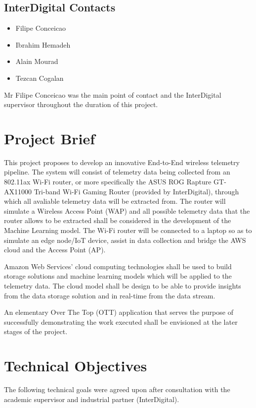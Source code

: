 \subsection{InterDigital Contacts}

\begin{itemize}
  \item Filipe Conceicao
  \item Ibrahim Hemadeh
  \item Alain Mourad
  \item Tezcan Cogalan
\end{itemize}

Mr Filipe Conceicao was the main point of contact and the InterDigital supervisor throughout the duration of this project.

\section{Project Brief}
\label{0_2_project_brief}
This project proposes to develop an innovative End-to-End wireless telemetry pipeline. The system will consist of telemetry data being collected from an 802.11ax Wi-Fi router, or more specifically the ASUS ROG Rapture GT-AX11000 Tri-band Wi-Fi Gaming Router \cite{ASUSRouter} (provided by InterDigital), through which all avaliable telemetry data will be extracted from. The router will simulate a Wireless Access Point (WAP) and all possible telemetry data that the router allows to be extracted shall be considered in the development of the Machine Learning model. The Wi-Fi router will be connected to a laptop so as to simulate an edge node/IoT device, assist in data collection and bridge the AWS cloud and the Access Point (AP). 

\noindent Amazon Web Services' cloud computing technologies shall be used to build storage solutions and machine learning models which will be applied to the telemetry data. The cloud model shall be design to be able to provide insights from the data storage solution and in real-time from the data stream. 

\noindent An elementary Over The Top (OTT) application that serves the purpose of successfully demonstrating the work executed shall be envisioned at the later stages of the project.


\section{Technical Objectives}

The following technical goals were agreed upon after consultation with the academic
supervisor and industrial partner (InterDigital).

